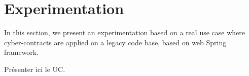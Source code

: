 \section{Experimentation}

In this section, we present an experimentation based on a real use case where cyber-contracts are applied on a legacy code base, based on web Spring framework.

Présenter ici le UC.


